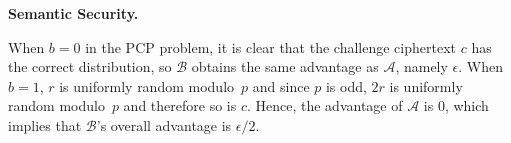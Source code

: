 \documentclass[a4paper, 12pt]{article}
\newenvironment{capsproof}[1][\proofname]{\proof[\scshape #1:]}{\endproof}
\newcommand{\mc}[1]{\mathcal{#1}}
\newcommand{\tbf}[1]{\textbf{#1}}
\newenvironment{bparagraph}[1]{
	\vspace{2ex}\noindent\tbf{#1. }\nolinebreak 
}{}
\begin{document}
\begin{bparagraph}{Semantic Security}
\begin{capsproof}
			When $b=0$ in the PCP problem, it is clear that the challenge ciphertext $c$ has the correct distribution, so $\mc{B}$ obtains the same advantage as $\mc{A}$, namely $\epsilon$.
			When $b=1$, $r$ is uniformly random modulo~$p$ and since $p$ is odd, $2r$ is uniformly random modulo~$p$ and therefore so is $c$.
			Hence, the advantage of $\mc{A}$ is 0, which implies that $\mc{B}$'s overall advantage is $\epsilon/2$.
		\end{capsproof}
		
	\end{bparagraph}
\end{document}
